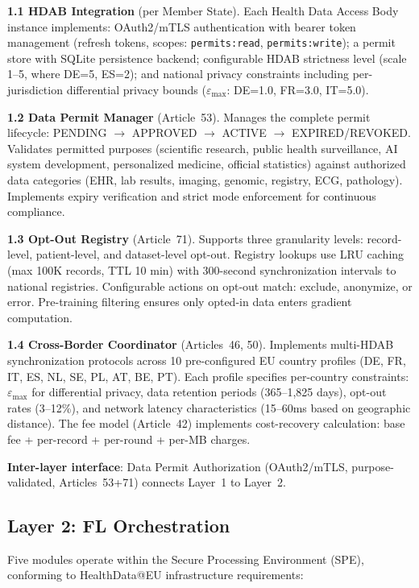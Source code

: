 \documentclass[conference]{IEEEtran}
\begin{document}
\textbf{1.1 HDAB Integration} (per Member State). Each Health Data Access Body instance implements: OAuth2/mTLS authentication with bearer token management (refresh tokens, scopes: \texttt{permits:read}, \texttt{permits:write}); a permit store with SQLite persistence backend; configurable HDAB strictness level (scale 1--5, where DE=5, ES=2); and national privacy constraints including per-jurisdiction differential privacy bounds ($\varepsilon_{\max}$: DE=1.0, FR=3.0, IT=5.0).

\textbf{1.2 Data Permit Manager} (Article~53). Manages the complete permit lifecycle: PENDING $\to$ APPROVED $\to$ ACTIVE $\to$ EXPIRED/REVOKED. Validates permitted purposes (scientific research, public health surveillance, AI system development, personalized medicine, official statistics) against authorized data categories (EHR, lab results, imaging, genomic, registry, ECG, pathology). Implements expiry verification and strict mode enforcement for continuous compliance.

\textbf{1.3 Opt-Out Registry} (Article~71). Supports three granularity levels: record-level, patient-level, and dataset-level opt-out. Registry lookups use LRU caching (max 100K records, TTL 10 min) with 300-second synchronization intervals to national registries. Configurable actions on opt-out match: exclude, anonymize, or error. Pre-training filtering ensures only opted-in data enters gradient computation.

\textbf{1.4 Cross-Border Coordinator} (Articles~46, 50). Implements multi-HDAB synchronization protocols across 10 pre-configured EU country profiles (DE, FR, IT, ES, NL, SE, PL, AT, BE, PT). Each profile specifies per-country constraints: $\varepsilon_{\max}$ for differential privacy, data retention periods (365--1,825 days), opt-out rates (3--12\%), and network latency characteristics (15--60ms based on geographic distance). The fee model (Article~42) implements cost-recovery calculation: base fee + per-record + per-round + per-MB charges.

\textbf{Inter-layer interface}: Data Permit Authorization (OAuth2/mTLS, purpose-validated, Articles~53+71) connects Layer~1 to Layer~2.

\subsection{Layer 2: FL Orchestration}

Five modules operate within the Secure Processing Environment (SPE), conforming to HealthData@EU infrastructure requirements:
\end{document}
